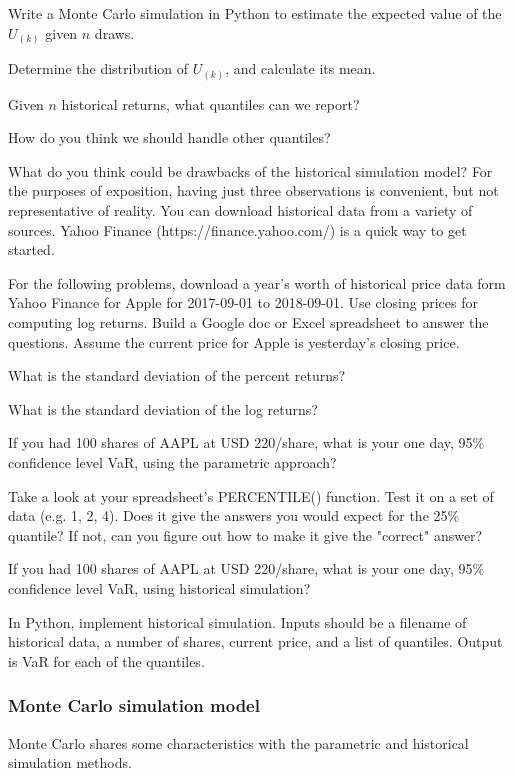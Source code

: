 \documentclass{report}
\numberwithin{problem}{chapter} %
\let\oldroblem\problem
\renewcommand{\problem}{ \oldroblem  \normalfont}
\newcommand{\vs}{\vspace}
\begin{document}
\problem Write a Monte Carlo simulation in Python to estimate the expected value of the $U_{(k)}$ given $n$ draws. 

\problem Determine the distribution of $U_{(k)}$, and calculate its mean. 

\problem Given $n$ historical returns, what quantiles can we report? 

\problem How do you think we should handle other quantiles?

\problem What do you think could be drawbacks of the historical simulation model?
\vs{5mm}
For the purposes of exposition, having just three observations is convenient, but not representative of reality. You can download historical data from a variety of sources. Yahoo Finance (https://finance.yahoo.com/) is a quick way to get started. 

For the following problems, download a year's worth of historical price data form Yahoo Finance for Apple for 2017-09-01 to 2018-09-01. Use closing prices for computing log returns.  Build a Google doc or Excel spreadsheet to answer the questions. Assume the current price for Apple is yesterday's closing price. 

\problem What is the standard deviation of the percent returns?

\problem What is the standard deviation of the log returns?

\problem If you had 100 shares of AAPL at USD 220/share, what is your one day, 95\% confidence level VaR, using the parametric approach?

\problem Take a look at your spreadsheet's PERCENTILE() function. Test it on a set of data (e.g. {1, 2, 4}). Does it give the answers you would expect for the 25\% quantile? If not, can you figure out how to make it give the "correct" answer?

\problem If you had 100 shares of AAPL at USD 220/share, what is your one day, 95\% confidence level VaR, using  historical simulation?

\problem In Python, implement historical simulation. Inputs should be a filename of historical data, a number of shares, current price, and a list of quantiles. Output is VaR for each of the quantiles. 

\subsubsection{Monte Carlo simulation model}
Monte Carlo shares some characteristics with the parametric and historical simulation methods. 
\end{document}
